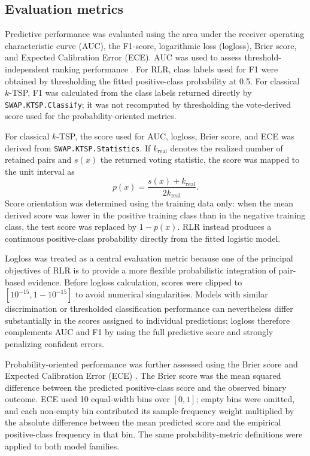 \documentclass[journal]{IEEEtran}
\begin{document}
\subsection{Evaluation metrics}

Predictive performance was evaluated using the area under the receiver operating characteristic curve (AUC), the F1-score, logarithmic loss (logloss), Brier score, and Expected Calibration Error (ECE). AUC was used to assess threshold-independent ranking performance \cite{Hanley1982}. For RLR, class labels used for F1 were obtained by thresholding the fitted positive-class probability at 0.5. For classical $k$-TSP, F1 was calculated from the class labels returned directly by \texttt{SWAP.KTSP.Classify}; it was not recomputed by thresholding the vote-derived score used for the probability-oriented metrics.

For classical $k$-TSP, the score used for AUC, logloss, Brier score, and ECE was derived from \texttt{SWAP.KTSP.Statistics}. If $k_{\mathrm{real}}$ denotes the realized number of retained pairs and $s(x)$ the returned voting statistic, the score was mapped to the unit interval as
\[
p(x)=\frac{s(x)+k_{\mathrm{real}}}{2k_{\mathrm{real}}}.
\]
Score orientation was determined using the training data only: when the mean derived score was lower in the positive training class than in the negative training class, the test score was replaced by $1-p(x)$. RLR instead produces a continuous positive-class probability directly from the fitted logistic model.

Logloss was treated as a central evaluation metric because one of the principal objectives of RLR is to provide a more flexible probabilistic integration of pair-based evidence. Before logloss calculation, scores were clipped to $[10^{-15},1-10^{-15}]$ to avoid numerical singularities. Models with similar discrimination or thresholded classification performance can nevertheless differ substantially in the scores assigned to individual predictions; logloss therefore complements AUC and F1 by using the full predictive score and strongly penalizing confident errors.

Probability-oriented performance was further assessed using the Brier score and Expected Calibration Error (ECE) \cite{VanCalster2019}. The Brier score was the mean squared difference between the predicted positive-class score and the observed binary outcome. ECE used 10 equal-width bins over $[0,1]$; empty bins were omitted, and each non-empty bin contributed its sample-frequency weight multiplied by the absolute difference between the mean predicted score and the empirical positive-class frequency in that bin. The same probability-metric definitions were applied to both model families.
\end{document}
